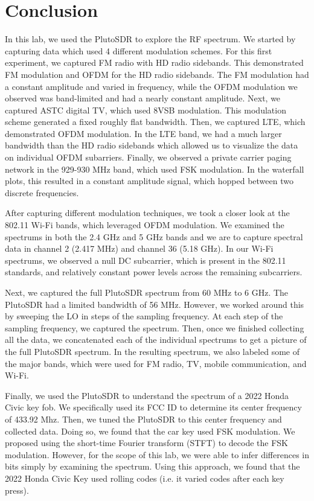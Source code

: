 \documentclass{article}
\begin{document}
\section{Conclusion}

In this lab, we used the PlutoSDR to explore the RF spectrum. We started by capturing data which used 4 different modulation schemes. For this first experiment, we captured FM radio with HD radio sidebands. This demonstrated FM modulation and OFDM for the HD radio sidebands. The FM modulation had a constant amplitude and varied in frequency, while the OFDM modulation we observed was band-limited and had a nearly constant amplitude. Next, we captured ASTC digital TV, which used 8VSB modulation. This modulation scheme generated a fixed roughly flat bandwidth. Then, we captured LTE, which demonstrated OFDM modulation. In the LTE band, we had a much larger bandwidth than the HD radio sidebands which allowed us to visualize the data on individual OFDM subarriers. Finally, we observed a private carrier paging network in the 929-930 MHz band, which used FSK modulation. In the waterfall plots, this resulted in a constant amplitude signal, which hopped between two discrete frequencies.

After capturing different modulation techniques, we took a closer look at the 802.11 Wi-Fi bands, which leveraged OFDM modulation. We examined the spectrums in both the 2.4 GHz and 5 GHz bands and we are to capture spectral data in channel 2 (2.417 MHz) and channel 36 (5.18 GHz). In our Wi-Fi spectrums, we observed a null DC subcarrier, which is present in the 802.11 standards, and relatively constant power levels across the remaining subcarriers.

Next, we captured the full PlutoSDR spectrum from 60 MHz to 6 GHz. The PlutoSDR had a limited bandwidth of 56 MHz. However, we worked around this by sweeping the LO in steps of the sampling frequency. At each step of the sampling frequency, we captured the spectrum. Then, once we finished collecting all the data, we concatenated each of the individual spectrums to get a picture of the full PlutoSDR spectrum. In the resulting spectrum, we also labeled some of the major bands, which were used for FM radio, TV, mobile communication, and Wi-Fi.

Finally, we used the PlutoSDR to understand the spectrum of a 2022 Honda Civic key fob. We specifically used its FCC ID to determine its center frequency of 433.92 Mhz. Then, we tuned the PlutoSDR to this center frequency and collected data. Doing so, we found that the car key used FSK modulation. We proposed using the short-time Fourier transform (STFT) to decode the FSK modulation. However, for the scope of this lab, we were able to infer differences in bits simply by examining the spectrum. Using this approach, we found that the 2022 Honda Civic Key used rolling codes (i.e. it varied codes after each key press).
\end{document}
